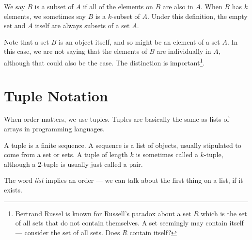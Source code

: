 \documentclass{iansnotes}
\begin{document}
  We say $B$ is a subset of $A$ if all of the elements on $B$ are also in $A$.
  When $B$ has $k$ elements, we sometimes say $B$ is a $k$-subset of $A$.
  Under this definition, the empty set and $A$ itself are always subsets of a set $A$.

  Note that a set $B$ is an object itself, and so might be an element of a set $A$.
  In this case, we are not saying that the elements of $B$ are individually in $A$, although that could also be the case.
  The distinction is important\footnote{Bertrand Russel is known for Russell's paradox about a set $R$ which is the set of all sets that do not contain themselves. A set seemingly may contain itself --- consider the set of all sets. Does $R$ contain itself?}.


\section{Tuple Notation}
  When order matters, we use tuples.
  Tuples are basically the same as lists of arrays in programming languages.

  A tuple is a finite sequence\autocite[6]{sipser}.
  A sequence is a list of objects, usually stipulated to come from a set or sets.
  A tuple of length $k$ is sometimes called a $k$-tuple, although a $2$-tuple is usually just called a pair.

  The word \emph{list} implies an order --- we can talk about the first thing on a list, if it exists.
\end{document}
